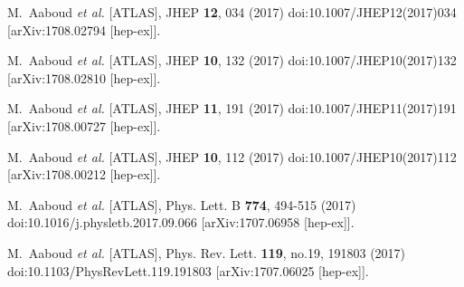\begin{thebibliography}{9}
M.~Aaboud \textit{et al.} [ATLAS],
JHEP \textbf{12}, 034 (2017)
doi:10.1007/JHEP12(2017)034
[arXiv:1708.02794 [hep-ex]].

M.~Aaboud \textit{et al.} [ATLAS],
JHEP \textbf{10}, 132 (2017)
doi:10.1007/JHEP10(2017)132
[arXiv:1708.02810 [hep-ex]].

M.~Aaboud \textit{et al.} [ATLAS],
JHEP \textbf{11}, 191 (2017)
doi:10.1007/JHEP11(2017)191
[arXiv:1708.00727 [hep-ex]].

M.~Aaboud \textit{et al.} [ATLAS],
JHEP \textbf{10}, 112 (2017)
doi:10.1007/JHEP10(2017)112
[arXiv:1708.00212 [hep-ex]].

M.~Aaboud \textit{et al.} [ATLAS],
Phys. Lett. B \textbf{774}, 494-515 (2017)
doi:10.1016/j.physletb.2017.09.066
[arXiv:1707.06958 [hep-ex]].

M.~Aaboud \textit{et al.} [ATLAS],
Phys. Rev. Lett. \textbf{119}, no.19, 191803 (2017)
doi:10.1103/PhysRevLett.119.191803
[arXiv:1707.06025 [hep-ex]].


\end{thebibliography}
